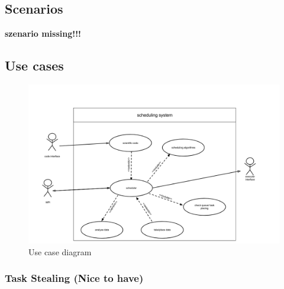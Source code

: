 \subsection{Scenarios}
			\textbf{szenario missing!!!}
\subsection{Use cases}

	\begin{figure}[H]
		\includegraphics[width=1.5\textwidth,scale=0.75,trim=7cm 0 -7cm 0]{images/usecasediagram.png}
		\caption{Use case diagram}
	\end{figure}

\subsubsection{Task Stealing (Nice to have)}

